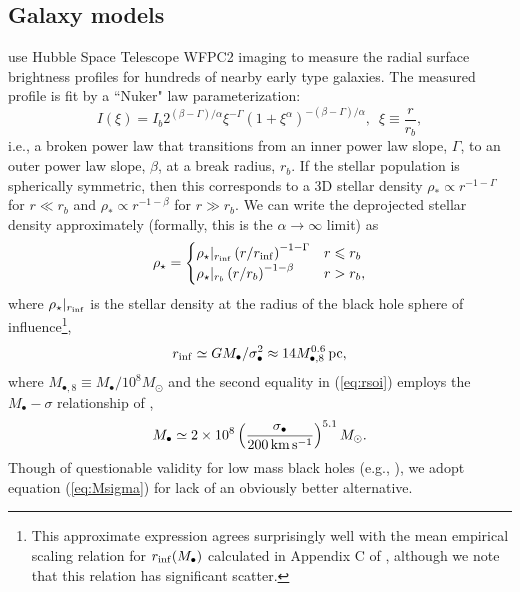 \documentclass[usenatbib,fleqn]{mn2e}
\newcommand{\rb}{r_b}
\newcommand{\rhostar}{\rho_*}
\newcommand{\Mbh}[1][]{M_{\bullet#1}}
\newcommand{\rinf}{r_{\rm inf}}
\begin{document}
\subsection{Galaxy models}
\label{sec:gal_model}
\citet{LauerFaber+:2007a} use Hubble Space Telescope WFPC2 imaging to
measure the radial surface brightness profiles for hundreds of nearby
early type galaxies. The measured profile is fit by a ``Nuker" law parameterization:
\begin{equation}
  I(\xi)=I_b 2^{(\beta-\Gamma)/\alpha} \xi^{-\Gamma} (1+\xi^\alpha)^{-(\beta-\Gamma)/\alpha}, \,\,\,\xi\equiv\frac{r}{r_b},
\end{equation}
i.e., a broken power law that transitions from an inner power law
slope, $\Gamma$, to an outer power law slope, $\beta$, at a break
radius, $\rb$.  If the stellar population is spherically symmetric,
then this corresponds to a 3D stellar density $\rhostar \propto
r^{-1-\Gamma}$ for $r \ll \rb$ and $\rhostar\propto r^{-1-\beta}$ for
$r \gg \rb$.  We can write the deprojected stellar density
approximately (formally, this is the $\alpha \rightarrow \infty$
limit) as
\begin{align}
\rho_\star = 
\begin{cases}
\rho_\star|_{\rinf} \left(r/\rinf\right)^{-1-\Gamma} & r \leq r_b\\
\rho_\star|_{r_b} \left(r/r_b\right)^{-1-\beta} & r > r_b,
\label{eq:rhostar}
\end{cases}
\end{align}
where $\rho_\star|_{\rinf}$ is the stellar density at the radius of
the black hole sphere of influence\footnote{This approximate
  expression agrees surprisingly well with the mean empirical scaling
  relation for $r_{\rm inf}(M_\bullet)$ calculated in Appendix C of
  \citet{Stone&Metzger15}, although we note that this relation has
  significant scatter.},
\begin{equation}
  \rinf \simeq G \Mbh/\sigma_{\bullet}^2 \approx 14 M_{\bullet,8}^{0.6}\,{\rm pc},
\label{eq:rsoi}
\end{equation}
where $M_{\bullet,8} \equiv M_{\bullet}/10^{8}M_{\odot}$ and the
second equality in (\ref{eq:rsoi}) employs the $\Mbh-\sigma$
relationship of \citet{McConnellMa+:2011a},
 \begin{align}
M_{\bullet} \simeq 2\times 10^{8}\left(\frac{\sigma_{\bullet}}{200\,{\rm
      km\,s^{-1}}}\right)^{5.1}M_{\odot}.
\label{eq:Msigma}
\end{align}
Though of questionable validity for low mass black holes (e.g.,
\citealt{Greene+2010, Kormendy+2013}), we adopt equation
(\ref{eq:Msigma}) for lack of an obviously better alternative.
\end{document}
